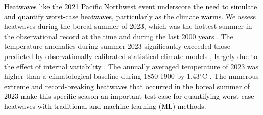 \documentclass[draft]{agujournal2019}
\renewcommand{\st}[1]{\unskip}
\newcommand{\newTxt}{\textcolor{black}}
\begin{document}
\newTxt{Heatwaves like the 2021 Pacific Northwest event underscore the need to simulate and quantify worst-case heatwaves, particularly as the climate warms.}  We assess heatwaves during the boreal summer of 2023, which was the hottest summer in the observational record at the time \citep{WMO2023} and during the last 2000 years \citep{Esper2024,Hegerl2024}. The temperature anomalies during summer 2023 significantly exceeded those predicted by observationally-calibrated statistical climate models \citep{Schmidt2024}, \newTxt{largely due to the effect of internal variability \citep{Gyuleva2025}.}  The annually averaged temperature of 2023 was higher than a climatological baseline during 1850-1900 by 1.43${}^\circ$C  \citep{Forster2024}.  \st{We elected to construct our huge ensemble of hindcasts for this summer to understand how several types of extremes, including heatwaves but also tropical cyclones and atmospheric rivers, would respond to these warmer conditions.} \newTxt{The numerous extreme and record-breaking heatwaves that occurred in the boreal summer of 2023 \citep{zachariah2023extreme} make this specific season an important test case for quantifying worst-case heatwaves with traditional and machine-learning (ML) methods.}

\end{document}
